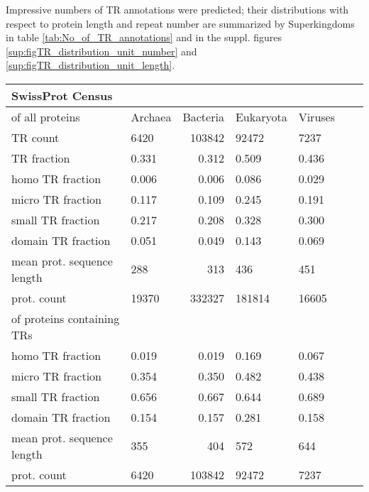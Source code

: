 \documentclass[a4,center,fleqn]{NAR}
\begin{document}
Impressive numbers of TR annotations were predicted; their distributions with respect to protein length and repeat number are summarized by Superkingdoms in table \ref{tab:No_of_TR_annotations} and in the suppl. figures \ref{sup:figTR_distribution_unit_number} and \ref{sup:figTR_distribution_unit_length}.

\begin{table*}[]
\tabcolsep=0.1cm
\begin{tabular*}{\textwidth}{@{\extracolsep{\fill}}llrllll@{}}
\hline
SwissProt Census \\ 
  \hline
  \hline

of all proteins & Archaea & Bacteria & Eukaryota & Viruses\\ 
  \hline
  TR count &   6420 & 103842 &  92472 &   7237 \\ 
  TR fraction & 0.331 & 0.312 & 0.509 & 0.436 \\ 
  \;homo TR fraction & 0.006 & 0.006 & 0.086 & 0.029 \\
  \;micro TR fraction & 0.117 & 0.109 & 0.245 & 0.191 \\ 
  \;small TR fraction & 0.217 & 0.208 & 0.328 & 0.300 \\ 
  \;domain TR fraction & 0.051 & 0.049 & 0.143 & 0.069 \\ 
  mean prot. sequence length & 288 & 313 & 436 & 451 \\ 
  prot. count &  19370 & 332327 & 181814 &  16605 \\ 

    \hline
  of proteins containing TRs   &   &   &   &   \\ 
  \hline
  homo TR fraction & 0.019 & 0.019 & 0.169 & 0.067 \\
  micro TR fraction & 0.354 & 0.350 & 0.482 & 0.438 \\ 
  small TR fraction & 0.656 & 0.667 & 0.644 & 0.689 \\ 
  domain TR fraction & 0.154 & 0.157 & 0.281 & 0.158 \\ 
  mean prot. sequence length & 355 & 404 & 572 & 644 \\ 
  prot. count &   6420 & 103842 &  92472 &   7237 \\ 
   \hline
\end{tabular*}
\caption{Swissprot entries by kingdoms for all proteins and for proteins that contain TR. 
Over all proteins, Bacteria has the most entries but Eukaryota the biggest fraction of proteins with TRs. Viruses tend to have the longest protein sequences - with or without TRs; followed by eukaryotic and prokaryotic proteins.
In general, small TR prevail over the other types. }
\label{tab:No_of_TR_annotations}
\end{table*}
\end{document}
